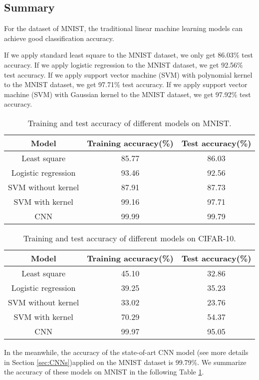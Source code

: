\subsection{Summary }
For the dataset of MNIST, the traditional linear machine learning models can achieve good classification accuracy. 

  If we apply standard least square to the  MNIST dataset, we only get 86.03\% test accuracy. If we apply logistic regression to the  MNIST dataset, we get 92.56\% test accuracy. If we apply support vector machine (SVM) with polynomial kernel to the  MNIST dataset, we get 97.71\% test accuracy. If we apply support vector machine (SVM) with Gaussian kernel to the  MNIST dataset, we get 97.92\% test accuracy. 

\begin{table}[!htbp]
	\begin{center}
		\begin{tabular}{|c|c|c|}
			\hline
			Model &  Training accuracy(\%)   &   Test accuracy(\%) \\
			\hline
			Least square & 85.77	           &   86.03 \\ \hline
			Logistic regression & 93.46   &   92.56	     \\ \hline
			SVM without kernel& 87.91           &   87.73         \\	\hline
			SVM with kernel& 99.16            &   97.71         \\	\hline
			CNN & 99.99            &   99.79         \\	\hline
		\end{tabular}
	\end{center}
	\caption{Training and test accuracy of different models on MNIST.}
	\label{tab:MNIST-LR-Results}
\end{table}


\begin{table}[!htbp]
	\begin{center}
		\begin{tabular}{|c|c|c|}
			\hline
			Model &  Training accuracy(\%)   &   Test accuracy(\%) \\
			\hline
			Least square & 45.10           &   32.86 \\ \hline
			Logistic regression & 39.25   &   35.23	     \\ \hline
			SVM without kernel& 33.02            &   23.76         \\	\hline
			SVM with kernel& 70.29            &   54.37         \\	\hline
			CNN & 99.97            &   95.05         \\	\hline
		\end{tabular}
	\end{center}
	\caption{Training and test accuracy of different models on CIFAR-10.}
	\label{tab:MNIST-LR-Results2}
\end{table}
In the meanwhile, the accuracy of the state-of-art CNN model (see more details in Section \ref{sec:CNNs})applied on the MNIST dataset is 99.79\%. We summarize the accuracy of these models on MNIST in the following Table \ref{tab:MNIST-LR-Results}.

